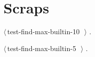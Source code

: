 \documentclass[a4paper,11pt]{article}
\begin{document}
\section*{Scraps}

{\small\begin{list}{}{\setlength{\itemsep}{-\parsep}\setlength{\itemindent}{-\leftmargin}}
\item $\langle\,$test-find-max-builtin-10\nobreak\ {\footnotesize {}}$\,\rangle$ {\footnotesize {\NWtxtRefIn} .}
\item $\langle\,$test-find-max-builtin-5\nobreak\ {\footnotesize {}}$\,\rangle$ {\footnotesize {\NWtxtRefIn} .}
\end{list}}



\end{document}
